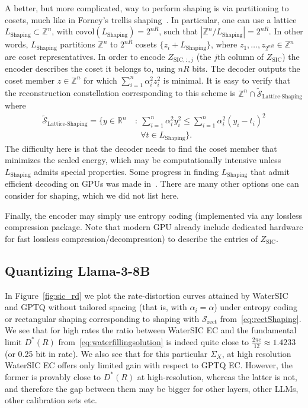 \documentclass[journal]{IEEEtran}
\newcommand{\ZZ}{\mathbb{Z}}
\newcommand{\RR}{\mathbb{R}}
\newcommand{\m}{\mathcal}
\newcommand{\covol}{\mathrm{covol}}
\begin{document}
A better, but more complicated, way to perform shaping is via partitioning to cosets, much like in Forney's trellis shaping~\cite{forney1992trellis,eyuboglu1993lattice}. In particular, one can use a lattice $L_{\text{Shaping}}\subset\ZZ^n$, with $\covol(L_{\text{Shaping}})=2^{nR}$, such that $|\ZZ^n/L_{\text{Shaping}}|=2^{nR}$. In other words, $L_{\text{Shaping}}$ partitions $\ZZ^n$ to $2^{nR}$ cosets $\{z_i+L_{\text{Shaping}}\}$, where $z_1,\ldots,z_{2^{nR}}\in\ZZ^n$ are coset representatives.
In order to encode $Z_{\mathrm{SIC},:,j}$ (the $j$th column of $Z_{\mathrm{SIC}}$) the encoder describes the coset it belongs to, using $nR$ bits. The decoder outputs the coset member $z\in\ZZ^n$ for which $\sum_{i=1}^n \alpha_i^2 z_i^2$ is minimal. It is easy to verify that the reconstruction constellation corresponding to this scheme is $\ZZ^n\cap\tilde{\m{S}}_{\text{Lattice-Shaping}}$ where
\begin{align}
\tilde{\m{S}}_{\text{Lattice-Shaping}}=\bigg\{y\in\RR^n~&:~\sum_{i=1}^n\alpha_i^2 y_i^2 \leq \sum_{i=1}^n\alpha_i^2 (y_i-t_i)^2 \nonumber\\
&~~~\forall t\in L_{\text{Shaping}} \bigg\}.    
\end{align}
The difficulty here is that the decoder needs to find the coset member that minimizes the scaled energy, which may be computationally intensive unless $L_{\text{Shaping}}$ admits special properties. Some progress in finding $L_{\text{Shaping}}$ that admit efficient decoding on GPUs was made in~\cite{savkin2025nestquant,tseng2024qtip}. There are many other options one can consider for shaping, which we did not list here.

Finally, the encoder may simply use entropy coding (implemented via any lossless compression package. Note that modern GPU already include dedicated hardware for fast lossless compression/decompression) to describe the entries of $Z_{\mathrm{SIC}}$.

\subsection{Quantizing Llama-3-8B} 

In Figure~\ref{fig:sic_rd} we plot the rate-distortion curves
attained by WaterSIC and GPTQ without tailored spacing (that is, with $\alpha_i=\alpha$) under
entropy coding or rectangular shaping corresponding to shaping with $\m{S}_{\text{rect}}$
from~\eqref{eq:rectShaping}. We see that for high rates the ratio between WaterSIC EC and the
fundamental limit $D^*(R)$ from~\eqref{eq:waterfillingsolution} is indeed quite close to
$\frac{2\pi e}{12}\approx 1.4233$ (or 0.25 bit in rate). We also see that for this particular $\Sigma_X$, at high
resolution WaterSIC EC offers only limited gain with respect to GPTQ EC. However, the former is
provably close to $D^*(R)$ at high-resolution, whereas the latter is not, and therefore the gap
between them may be bigger for other layers, other LLMs, other calibration sets etc. 
\end{document}
